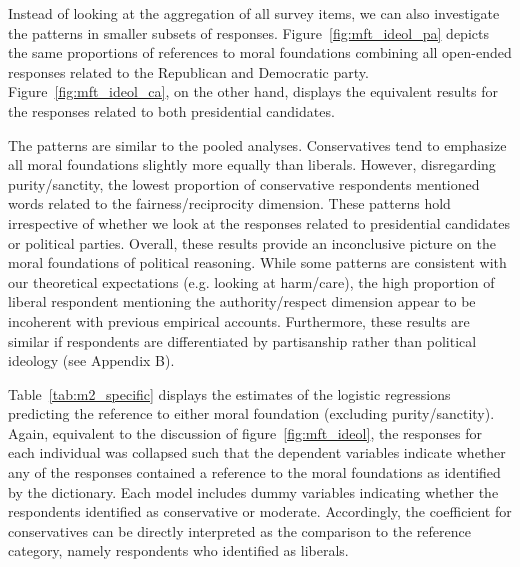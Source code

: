 \documentclass[12pt]{paper}
\begin{document}
Instead of looking at the aggregation of all survey items, we can also investigate the patterns in smaller subsets of responses. Figure~\ref{fig:mft_ideol_pa} depicts the same proportions of references to moral foundations combining all open-ended responses related to the Republican and Democratic party. Figure~\ref{fig:mft_ideol_ca}, on the other hand, displays the equivalent results for the responses related to both presidential candidates.

The patterns are similar to the pooled analyses. Conservatives tend to emphasize all moral foundations slightly more equally than liberals. However, disregarding  purity/sanctity, the lowest proportion of conservative respondents mentioned words related to the fairness/reciprocity dimension. These patterns hold irrespective of whether we look at the responses related to presidential candidates or political parties. Overall, these results provide an inconclusive picture on the moral foundations of political reasoning. While some patterns are consistent with our theoretical expectations (e.g. looking at harm/care), the high proportion of liberal respondent mentioning the authority/respect dimension appear to be incoherent with previous empirical accounts. Furthermore, these results are similar if respondents are differentiated by partisanship rather than political ideology (see Appendix B).

Table~\ref{tab:m2_specific} displays the estimates of the logistic regressions predicting the reference to either moral foundation (excluding purity/sanctity). Again, equivalent to the discussion of figure~\ref{fig:mft_ideol}, the responses for each individual was collapsed such that the dependent variables indicate whether any of the responses contained a reference to the moral foundations as identified by the dictionary. Each model includes dummy variables indicating whether the respondents identified as conservative or moderate. Accordingly, the coefficient for conservatives can be directly interpreted as the comparison to the reference category, namely respondents who identified as liberals.

\begin{landscape}\centering
\section*{}\vspace{1.5cm}

\end{landscape}
\end{document}
